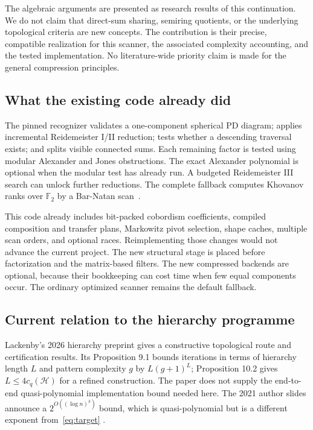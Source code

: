 \documentclass[11pt,letterpaper]{article}
\newcommand{\F}{\mathbb F_2}
\begin{document}
The algebraic arguments are presented as research results of this
continuation. We do not claim that direct-sum sharing, semiring quotients, or
the underlying topological criteria are new concepts. The contribution is
their precise, compatible realization for this scanner, the associated
complexity accounting, and the tested implementation. No literature-wide
priority claim is made for the general compression principles.

\subsection{What the existing code already did}
The pinned recognizer validates a one-component spherical PD diagram; applies
incremental Reidemeister I/II reduction; tests whether a descending traversal
exists; and splits visible connected sums. Each remaining factor is tested
using modular Alexander and Jones obstructions. The exact Alexander
polynomial is optional when the modular test has already run. A budgeted
Reidemeister III search can unlock further reductions. The complete fallback
computes Khovanov ranks over $\F$ by a Bar-Natan scan~\cite{bnfast}.

This code already includes bit-packed cobordism coefficients, compiled
composition and transfer plans, Markowitz pivot selection, shape caches,
multiple scan orders, and optional races. Reimplementing those changes would
not advance the current project. The new structural stage is placed before
factorization and the matrix-based filters. The new compressed backends are
optional, because their bookkeeping can cost time when few equal components
occur. The ordinary optimized scanner remains the default fallback.

\subsection{Current relation to the hierarchy programme}
Lackenby's 2026 hierarchy preprint gives a constructive topological route and
certification results. Its Proposition 9.1 bounds iterations in terms of
hierarchy length $L$ and pattern complexity $g$ by $L(g+1)^L$; Proposition
10.2 gives $L\le4c_q(\mathcal H)$ for a refined construction. The paper does
not supply the end-to-end quasi-polynomial implementation bound needed here.
The 2021 author slides announce a $2^{O((\log n)^3)}$ bound, which is
quasi-polynomial but is a different exponent from~\eqref{eq:target}
\cite{lackenby2026,lackenbytalk}.
\end{document}
